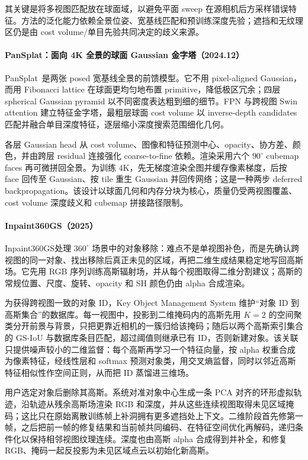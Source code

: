其关键是将多视图匹配放在球面域，以避免平面 sweep 在源相机后方采样错误特征。方法的泛化能力依赖全景位姿、宽基线匹配和预训练深度先验；遮挡和无纹理区仍是由 cost volume/单目先验共同决定的歧义来源。


\paragraph{PanSplat：面向 4K 全景的球面 Gaussian 金字塔（2024.12）}
PanSplat~\cite{2412_12096}是两张 posed 宽基线全景的前馈模型。它不用 pixel-aligned Gaussian，而用 Fibonacci lattice 在球面更均匀地布置 primitive，降低极区冗余；四层 spherical Gaussian pyramid 以不同密度表达粗到细的细节。FPN 与跨视图 Swin attention 建立特征金字塔，最粗层球面 cost volume 以 inverse-depth candidates 匹配并融合单目深度特征，逐层缩小深度搜索范围细化几何。

各层 Gaussian head 从 cost volume、图像和特征预测中心、opacity、协方差、颜色，并由跨层 residual 连接强化 coarse-to-fine 依赖。渲染采用六个 $90^\circ$ cubemap faces 再可微拼回全景。为训练 4K，先无梯度渲染全图并缓存像素梯度，后按 face 回传至 Gaussian、按 tile 重生 Gaussian 并回传网络；这是一种两步 deferred backpropagation。该设计以球面几何和内存分块为核心，质量仍受两视图覆盖、cost volume 深度歧义和 cubemap 拼接路径限制。


\paragraph{Inpaint360GS（2025）\cite{2511_06457}}
Inpaint360GS处理 $360^\circ$ 场景中的对象移除：难点不是单视图补色，而是先确认跨视图的同一对象、找出移除后真正未见的区域，再把二维生成结果稳定地写回高斯场。它先用 RGB 序列训练高斯辐射场，并从每个视图取得二维分割建议；高斯的常规位置、尺度、旋转、opacity 和 SH 颜色仍由 alpha 合成渲染。

为获得跨视图一致的对象 ID，Key Object Management System 维护“对象 ID 到高斯集合”的数据库。每一视图中，投影到二维掩码内的高斯先用 $K=2$ 的空间聚类分开前景与背景，只把更靠近相机的一簇归给该掩码；随后以两个高斯索引集合的 GS-IoU 与数据库条目匹配，超过阈值则继承已有 ID，否则新建对象。该关联只提供噪声较小的二维监督：每个高斯再学习一个特征向量，按 alpha 权重合成为像素特征，经线性层和 softmax 预测对象类，用交叉熵监督，同时以邻近高斯特征相似性作空间正则，从而把 ID 蒸馏进三维场。

用户选定对象后删除其高斯。系统对准对象中心生成一条 PCA 对齐的环形虚拟轨迹，沿轨迹从残余高斯场渲染 RGB 和深度，并从这些连续视图取得未见区域掩码；这比只在原始离散训练帧上补洞拥有更多遮挡处上下文。二维阶段首先修第一帧，之后把前一帧的修复结果和当前帧共同编码、在特征空间优化再解码，递归条件化以保持相邻视图纹理连续。深度也由高斯 alpha 合成得到并补全，和修复 RGB、掩码一起反投影为未见区域点云以初始化新高斯。

